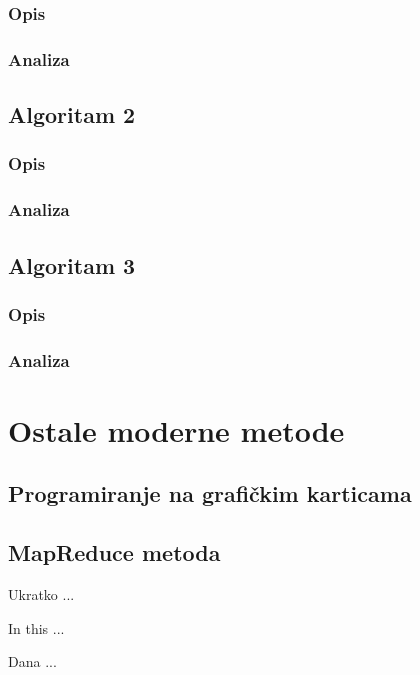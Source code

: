 \documentclass[a4paper,twoside,12pt]{memoir} %
\begin{document}
\subsection{Opis}
\subsection{Analiza}
\section{Algoritam 2}
\subsection{Opis}
\subsection{Analiza}
\section{Algoritam 3}
\subsection{Opis}
\subsection{Analiza}
\chapter{Ostale moderne metode}
\section{Programiranje na grafičkim karticama}
\section{MapReduce metoda}



\pagestyle{empty} %


\begin{sazetak}
Ukratko ...
\end{sazetak}

\begin{summary}
In this ...
\end{summary}


\begin{cv}
Dana ...
\end{cv}
\end{document}
